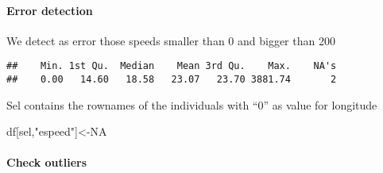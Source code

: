 \documentclass[
  18pt,
  a4paper]{article}
\newenvironment{Shaded}{\begin{snugshade}}{\end{snugshade}}
\newcommand{\CommentTok}[1]{\textcolor[rgb]{0.56,0.35,0.01}{\textit{#1}}}
\newcommand{\DecValTok}[1]{\textcolor[rgb]{0.00,0.00,0.81}{#1}}
\newcommand{\KeywordTok}[1]{\textcolor[rgb]{0.13,0.29,0.53}{\textbf{#1}}}
\newcommand{\NormalTok}[1]{#1}
\newcommand{\OperatorTok}[1]{\textcolor[rgb]{0.81,0.36,0.00}{\textbf{#1}}}
\newcommand{\OtherTok}[1]{\textcolor[rgb]{0.56,0.35,0.01}{#1}}
\newcommand{\StringTok}[1]{\textcolor[rgb]{0.31,0.60,0.02}{#1}}
\begin{document}
\hypertarget{error-detection}{%
\paragraph{Error detection}\label{error-detection}}

We detect as error those speeds smaller than 0 and bigger than 200

\begin{Shaded}
\end{Shaded}

\begin{verbatim}
##    Min. 1st Qu.  Median    Mean 3rd Qu.    Max.    NA's 
##    0.00   14.60   18.58   23.07   23.70 3881.74       2
\end{verbatim}

\begin{Shaded}
\end{Shaded}

Sel contains the rownames of the individuals with ``0'' as value for
longitude

\begin{Shaded}
\begin{Highlighting}[]
\NormalTok{df[sel,}\StringTok{"espeed"}\NormalTok{]<-}\OtherTok{NA} 
\end{Highlighting}
\end{Shaded}

\hypertarget{check-outliers}{%
\paragraph{Check outliers}\label{check-outliers}}

\begin{Shaded}
\end{Shaded}
\end{document}

